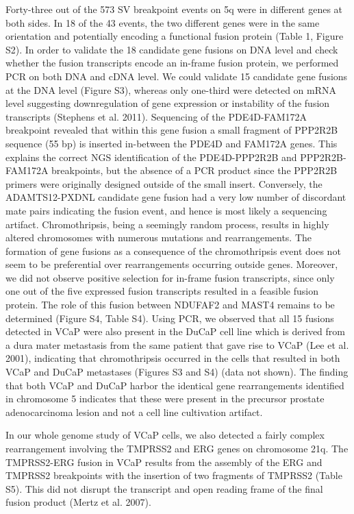 Forty-three out of the 573 SV breakpoint events on 5q were in different genes at both sides. In 18 of the 43 events, the two different genes were in the same orientation and potentially encoding a functional fusion protein (Table 1, Figure S2). In order to validate the 18 candidate gene fusions on DNA level and check whether the fusion transcripts encode an in-frame fusion protein, we performed PCR on both DNA and cDNA level. We could validate 15 candidate gene fusions at the DNA level (Figure S3), whereas only one-third were detected on mRNA level suggesting downregulation of gene expression or instability of the fusion transcripts (Stephens et al. 2011). Sequencing of the PDE4D-FAM172A breakpoint revealed that within this gene fusion a small fragment of PPP2R2B sequence (55 bp) is inserted in-between the PDE4D and FAM172A genes. This explains the correct NGS identification of the PDE4D-PPP2R2B and PPP2R2B-FAM172A breakpoints, but the absence of a PCR product since the PPP2R2B primers were originally designed outside of the small insert. Conversely, the ADAMTS12-PXDNL candidate gene fusion had a very low number of discordant mate pairs indicating the fusion event, and hence is most likely a sequencing artifact. Chromothripsis, being a seemingly random process, results in highly altered chromosomes with numerous mutations and rearrangements. The formation of gene fusions as a consequence of the chromothripsis event does not seem to be preferential over rearrangements occurring outside genes. Moreover, we did not observe positive selection for in-frame fusion transcripts, since only one out of the five expressed fusion transcripts resulted in a feasible fusion protein. The role of this fusion between NDUFAF2 and MAST4 remains to be determined (Figure S4, Table S4). Using PCR, we observed that all 15 fusions detected in VCaP were also present in the DuCaP cell line which is derived from a dura mater metastasis from the same patient that gave rise to VCaP (Lee et al. 2001), indicating that chromothripsis occurred in the cells that resulted in both VCaP and DuCaP metastases (Figures S3 and S4) (data not shown). The finding that both VCaP and DuCaP harbor the identical gene rearrangements identified in chromosome 5 indicates that these were present in the precursor prostate adenocarcinoma lesion and not a cell line cultivation artifact.







In our whole genome study of VCaP cells, we also detected a fairly complex rearrangement involving the TMPRSS2 and ERG genes on chromosome 21q. The TMPRSS2-ERG fusion in VCaP results from the assembly of the ERG and TMPRSS2 breakpoints with the insertion of two fragments of TMPRSS2 (Table S5). This did not disrupt the transcript and open reading frame of the final fusion product (Mertz et al. 2007).

